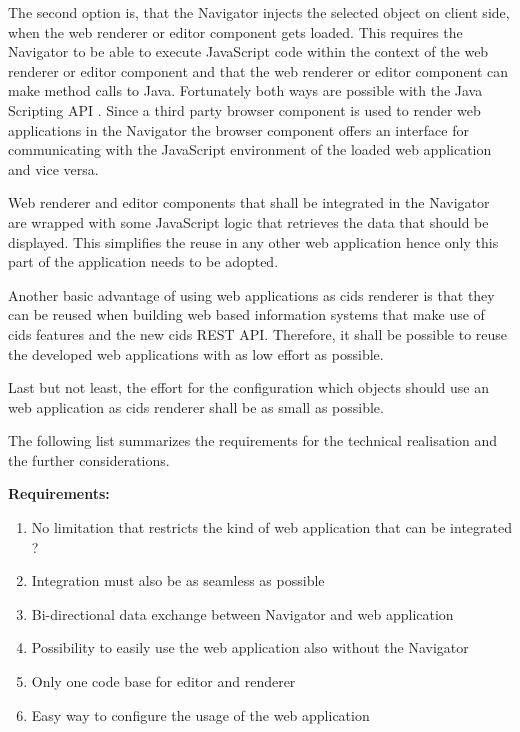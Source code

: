 The second option is, that the Navigator injects the selected object on client side, when the web renderer or editor component gets loaded.
This requires the Navigator to be able to execute JavaScript code within the context of the web renderer or editor component and that the web renderer or editor component can make method calls to Java.
Fortunately both ways are possible with the Java Scripting API \autocite{conception:rhino}.
Since a third party browser component is used to render web applications in the Navigator the browser component offers an interface for communicating with the JavaScript environment of the loaded web application and vice versa.

Web renderer and editor components that shall be integrated in the Navigator are wrapped with some JavaScript logic that retrieves the data that should be displayed.
This simplifies the reuse in any other web application hence only this part of the application needs to be adopted.
	
Another basic advantage of using web applications as cids renderer is that they can be reused when building web based information systems that make use of cids features and the new cids REST API.
Therefore, it shall be possible to reuse the developed web applications with as low effort as possible.

Last but not least, the effort for the configuration which objects should use an web application as cids renderer shall be as small as possible.

The following list summarizes the requirements for the technical realisation and the further considerations.

\textbf{Requirements:}
\begin{enumerate}
\item No limitation that restricts the kind of web application that can be integrated ?
\item Integration must also be as seamless as possible 
\item Bi-directional data exchange between Navigator and web application
\item Possibility to easily use the web application also without the Navigator
\item Only one code base for editor and renderer
\item Easy way to configure the usage of the web application
\end{enumerate} 


